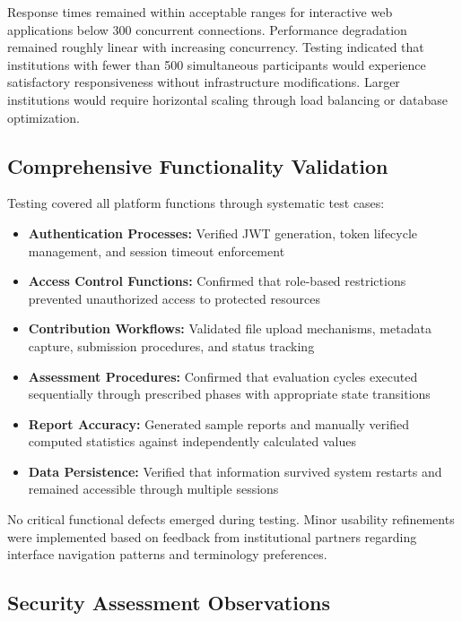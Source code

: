 \documentclass[conference]{IEEEtran}
\begin{document}
Response times remained within acceptable ranges for interactive web applications below 300 concurrent connections. Performance degradation remained roughly linear with increasing concurrency. Testing indicated that institutions with fewer than 500 simultaneous participants would experience satisfactory responsiveness without infrastructure modifications. Larger institutions would require horizontal scaling through load balancing or database optimization.

\subsection{Comprehensive Functionality Validation}
\label{subsec:functional}

Testing covered all platform functions through systematic test cases:

\begin{itemize}
\item \textbf{Authentication Processes:} Verified JWT generation, token lifecycle management, and session timeout enforcement
\item \textbf{Access Control Functions:} Confirmed that role-based restrictions prevented unauthorized access to protected resources
\item \textbf{Contribution Workflows:} Validated file upload mechanisms, metadata capture, submission procedures, and status tracking
\item \textbf{Assessment Procedures:} Confirmed that evaluation cycles executed sequentially through prescribed phases with appropriate state transitions
\item \textbf{Report Accuracy:} Generated sample reports and manually verified computed statistics against independently calculated values
\item \textbf{Data Persistence:} Verified that information survived system restarts and remained accessible through multiple sessions
\end{itemize}

No critical functional defects emerged during testing. Minor usability refinements were implemented based on feedback from institutional partners regarding interface navigation patterns and terminology preferences.

\subsection{Security Assessment Observations}
\label{subsec:security}
\end{document}
